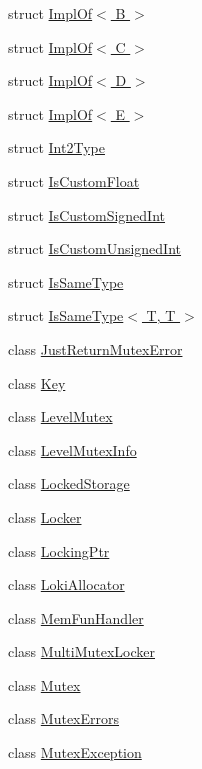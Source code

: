 \begin{DoxyCompactItemize}
\item 
struct \hyperlink{structLoki_1_1ImplOf_3_01B_01_4}{Impl\+Of$<$ B $>$}
\item 
struct \hyperlink{structLoki_1_1ImplOf_3_01C_01_4}{Impl\+Of$<$ C $>$}
\item 
struct \hyperlink{structLoki_1_1ImplOf_3_01D_01_4}{Impl\+Of$<$ D $>$}
\item 
struct \hyperlink{structLoki_1_1ImplOf_3_01E_01_4}{Impl\+Of$<$ E $>$}
\item 
struct \hyperlink{structLoki_1_1Int2Type}{Int2\+Type}
\item 
struct \hyperlink{structLoki_1_1IsCustomFloat}{Is\+Custom\+Float}
\item 
struct \hyperlink{structLoki_1_1IsCustomSignedInt}{Is\+Custom\+Signed\+Int}
\item 
struct \hyperlink{structLoki_1_1IsCustomUnsignedInt}{Is\+Custom\+Unsigned\+Int}
\item 
struct \hyperlink{structLoki_1_1IsSameType}{Is\+Same\+Type}
\item 
struct \hyperlink{structLoki_1_1IsSameType_3_01T_00_01T_01_4}{Is\+Same\+Type$<$ T, T $>$}
\item 
class \hyperlink{classLoki_1_1JustReturnMutexError}{Just\+Return\+Mutex\+Error}
\item 
class \hyperlink{classLoki_1_1Key}{Key}
\item 
class \hyperlink{classLoki_1_1LevelMutex}{Level\+Mutex}
\item 
class \hyperlink{classLoki_1_1LevelMutexInfo}{Level\+Mutex\+Info}
\item 
class \hyperlink{classLoki_1_1LockedStorage}{Locked\+Storage}
\item 
class \hyperlink{classLoki_1_1Locker}{Locker}
\item 
class \hyperlink{classLoki_1_1LockingPtr}{Locking\+Ptr}
\item 
class \hyperlink{classLoki_1_1LokiAllocator}{Loki\+Allocator}
\item 
class \hyperlink{classLoki_1_1MemFunHandler}{Mem\+Fun\+Handler}
\item 
class \hyperlink{classLoki_1_1MultiMutexLocker}{Multi\+Mutex\+Locker}
\item 
class \hyperlink{classLoki_1_1Mutex}{Mutex}
\item 
class \hyperlink{classLoki_1_1MutexErrors}{Mutex\+Errors}
\item 
class \hyperlink{classLoki_1_1MutexException}{Mutex\+Exception}
\item 

\end{DoxyCompactItemize}
